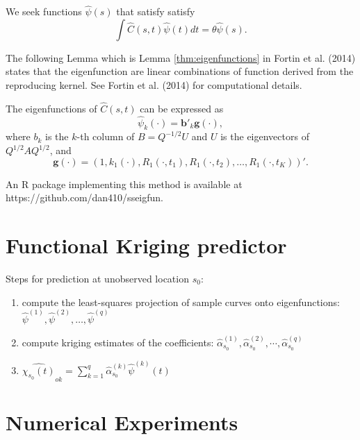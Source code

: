 We seek functions $\hat{\psi}(s)$ that satisfy satisfy
 \begin{equation} \label{eq:eigenfuns}
 \int \hat{C}(s,t)\hat{\psi}(t)dt=\theta\hat{\psi}(s).
 \end{equation}

The following Lemma which is Lemma \ref{thm:eigenfunctions} in Fortin et al. (2014) states that the eigenfunction are linear combinations of function derived from the reproducing kernel. See Fortin et al. (2014) for computational details.

\begin{lemma} \label{thm:eigenfunctions}
	The eigenfunctions of $\hat{C}(s,t)$ can be expressed as
	\begin{equation*}
		\hat{\psi}_k(\cdot) = \mathbf{b}'_k\mathbf{g}(\cdot),	
	\end{equation*}
	where $b_k$ is the $k$-th column of $B=Q^{-1/2}U$ and $U$ is the eigenvectors of $Q^{1/2}AQ^{1/2}$, and 
\[
\mathbf{g(\cdot)}=(1, k_1(\cdot),R_{1}(\cdot, t_1),R_{1}(\cdot, t_2),\dots, R_{1}(\cdot, t_K))'.
\]
\end{lemma}
An R package implementing this method is available at https://github.com/dan410/sseigfun.

\section{Functional Kriging predictor} %
\label{sec:functional_kriging_predictor}

Steps for prediction at unobserved location $s_0$:
\begin{enumerate}
\item compute the least-squares projection of sample curves onto eigenfunctions: $\hat{\psi}^{(1)}, \hat{\psi}^{(2)}, \dots, \hat{\psi}^{(q)}$ 
\item compute kriging estimates of the coefficients: $\hat{\alpha}_{s_0}^{(1)}, \hat{\alpha}_{s_0}^{(2)}, \cdots, \hat{\alpha}_{s_0}^{(q)}$ 
\item $\widehat{\chi_{s_0}(t)}_{ok} = \sum_{k=1}^{q} \hat{\alpha}_{s_0}^{(k)}\hat{\psi}^{(k)}(t)$ %
\end{enumerate}


\section{Numerical Experiments} %
\label{sec:numerical_experiments}

